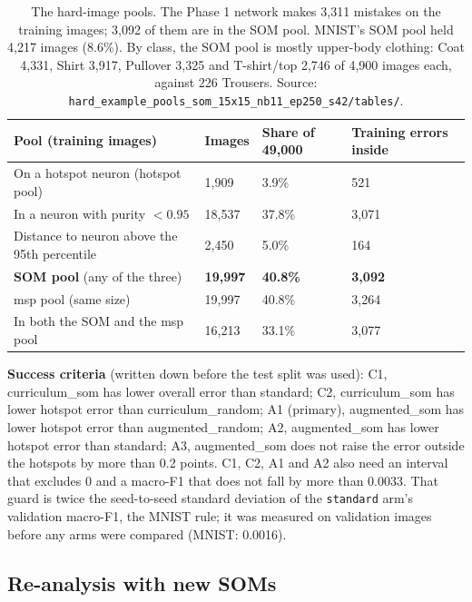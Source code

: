\documentclass[11pt]{article}
\begin{document}
\begin{table}[H]
\centering
\renewcommand{\arraystretch}{1.1}
\small
\begin{tabular}{|l|C{0.11\textwidth}|C{0.13\textwidth}|C{0.17\textwidth}|}
\hline
\textbf{Pool (training images)} & \textbf{Images} & \textbf{Share of 49,000} & \textbf{Training errors inside} \\ \hline
On a hotspot neuron (hotspot pool) & 1,909 & 3.9\% & 521 \\ \hline
In a neuron with purity $<0.95$ & 18,537 & 37.8\% & 3,071 \\ \hline
Distance to neuron above the 95th percentile & 2,450 & 5.0\% & 164 \\ \hline
\textbf{SOM pool} (any of the three) & \textbf{19,997} & \textbf{40.8\%} & \textbf{3,092} \\ \hline
msp pool (same size) & 19,997 & 40.8\% & 3,264 \\ \hline
In both the SOM and the msp pool & 16,213 & 33.1\% & 3,077 \\ \hline
\end{tabular}
\caption{The hard-image pools. The Phase 1 network makes 3,311 mistakes on the training images; 3,092 of them are in the SOM pool. MNIST's SOM pool held 4,217 images (8.6\%). By class, the SOM pool is mostly upper-body clothing: Coat 4,331, Shirt 3,917, Pullover 3,325 and T-shirt/top 2,746 of 4,900 images each, against 226 Trousers. Source: \texttt{hard\_example\_pools\_som\_15x15\_nb11\_ep250\_s42/tables/}.}
\label{tab:pools}
\end{table}

\textbf{Success criteria} (written down before the test split was used): C1, curriculum\_som has lower overall error than standard; C2, curriculum\_som has lower hotspot error than curriculum\_random; A1 (primary), augmented\_som has lower hotspot error than augmented\_random; A2, augmented\_som has lower hotspot error than standard; A3, augmented\_som does not raise the error outside the hotspots by more than 0.2 points. C1, C2, A1 and A2 also need an interval that excludes 0 and a macro-F1 that does not fall by more than 0.0033. That guard is twice the seed-to-seed standard deviation of the \texttt{standard} arm's validation macro-F1, the MNIST rule; it was measured on validation images before any arms were compared (MNIST: 0.0016).

\subsection*{Re-analysis with new SOMs}
\end{document}
